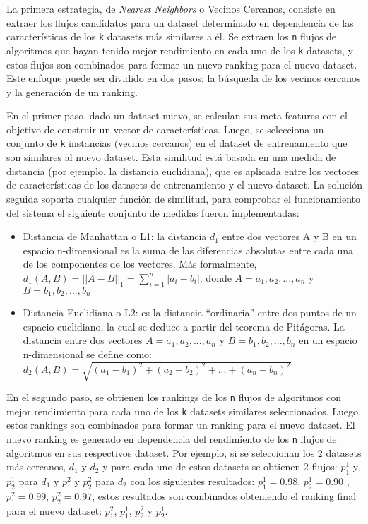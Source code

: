 La primera estrategia, de \textit{Nearest Neighbors} o Vecinos Cercanos, consiste en extraer los flujos candidatos para un dataset determinado en dependencia de las características de los \texttt{k} datasets más similares a él. Se extraen los \texttt{n} flujos de algoritmos que hayan tenido mejor rendimiento en cada uno de los \texttt{k} datasets, y estos flujos son combinados para formar un nuevo ranking para el nuevo dataset. Este enfoque puede ser dividido en dos pasos: la búsqueda de los vecinos cercanos y la generación de un ranking.

En el primer paso, dado un dataset nuevo, se calculan sus meta-features con el objetivo de construir un vector de características. Luego, se selecciona un conjunto de \texttt{k} instancias (vecinos cercanos) en el dataset de entrenamiento que son similares al nuevo dataset. Esta similitud está basada en una medida de distancia (por ejemplo, la distancia euclidiana), que es aplicada entre los vectores de características de los datasets de entrenamiento y el nuevo dataset. La solución seguida soporta cualquier función de similitud, para comprobar el funcionamiento del sistema el siguiente conjunto de medidas fueron implementadas:

\begin{itemize}
	\item Distancia de Manhattan o L1: la distancia $d_1$ entre dos vectores A y B en un espacio n-dimensional es la suma de las diferencias absolutas entre cada una de los componentes de los vectores. Más formalmente, $d_1(A, B) = {||A - B||}_1 = \sum^n_{i=1} |a_i - b_i|$, donde $A = a_1, a_2, ..., a_n$ y $B = b_1, b_2, ..., b_n$
	\item Distancia Euclidiana o L2: es la distancia ``ordinaria'' entre dos puntos de un espacio euclidiano, la cual se deduce a partir del teorema de Pitágoras. La distancia entre dos vectores $A = a_1, a_2, ..., a_n$ y $B = b_1, b_2, ..., b_n$ en un espacio n-dimensional se define como: $d_2(A, B)=\sqrt{(a_1 - b_1)^2 + (a_2 - b_2)^2 + ... + (a_n - b_n)^2}$
\end{itemize}

En el segundo paso, se obtienen los rankings de los \texttt{n} flujos de algoritmos con mejor rendimiento para cada uno de los \texttt{k} datasets similares seleccionados. Luego, estos rankings son combinados para formar un ranking para el nuevo dataset. El nuevo ranking es generado en dependencia del rendimiento de los \texttt{n} flujos de algoritmos en sus respectivos dataset. Por ejemplo, si se seleccionan los $2$ datasets más cercanos, $d_1$ y $d_2$ y para cada uno de estos datasets se obtienen $2$ flujos: $p^1_1$ y $p^1_2$ para $d_1$ y $p^2_1$ y $p^2_2$ para $d_2$ con los siguientes resultados: $p^1_1 = 0.98$, $p^1_2 = 0.90$ , $p^2_1 = 0.99$, $p^2_2 = 0.97$, estos resultados son combinados obteniendo el ranking final para el nuevo dataset: $p^2_1$, $p^1_1$, $p^2_2$ y $p^1_2$.

